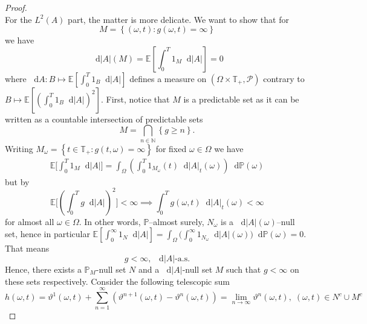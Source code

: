 \documentclass[11pt,a4paper,twoside,openany]{report}
\newcommand{\diff}{\mathop{}\!\mathrm{d}}
\theoremstyle{plain} %
\theoremstyle{definition} %
\theoremstyle{remark} %
\begin{document}
\begin{proof}
\begin{equation}
    \end{equation}
    For the \(L^2(A)\) part, the matter is more delicate. 
    We want to show that for
    \begin{equation}
        M=\left\{(\omega,t):g(\omega,t)=\infty\right\}
    \end{equation}
     we have 
     \begin{equation}
         \diff |A|(M) = \mathbb{E}[\int_0^T1_M\diff |A|]=0
     \end{equation}
     where \(\diff A:B\mapsto \mathbb{E}[\int_0^T1_B\diff |A|]\) defines a measure on \((\Omega\times\mathbb{T}_+,\mathcal{P})\) contrary to \(B\mapsto \mathbb{E}[\left(\int_0^T1_B\diff |A|\right)^2]\). First, notice that \(M\) is a predictable set as it can be written as a countable intersection of predictable sets
     \begin{equation}
         M=\bigcap_{n\in\mathbb{N}}\left\{g\geq n\right\}.
     \end{equation}
Writing \(M_{\omega}=\left\{t\in\mathbb{T}_+:g(t,\omega)=\infty\right\}\) for fixed \(\omega\in\Omega\) we have 
     \begin{align}
         \mathbb{E}\bigg[\int_0^T1_M\diff |A|\bigg]=\int_{\Omega}\left(\int_0^T1_{M_{\omega}}(t)\diff |A|_t(\omega)\right)\diff \mathbb{P}(\omega)
     \end{align}
     but by
     \begin{equation}
          \mathbb{E}\bigg[\left(\int_{0}^Tg\diff |A|\right)^2\bigg]<\infty\implies \int_{0}^Tg(\omega,t)\diff |A|_t(\omega)<\infty
     \end{equation}
     for almost all \(\omega\in \Omega\).
  In other words, \(\mathbb{P}\)--almost surely, \(N_{\omega}\) is a \(\diff|A|(\omega)\)--null set, hence in particular \(\mathbb{E}[\int_0^\infty 1_N\diff|A|]=\int_{\Omega}\big(\int_0^\infty 1_{N_{\omega}}\diff |A|(\omega)\big)\diff\mathbb{P}(\omega)=0\). That means
     \begin{equation}
         g<\infty,\; \diff |A|\text{-a.s.}
     \end{equation}
 Hence, there exists a \(\mathbb{P}_M\)-null set \(N\) and a \(\diff |A|\)-null set \(M\) such that \(g<\infty\) on these sets respectively. 
 Consider the following telescopic sum
 \begin{equation}
     h(\omega,t) = \vartheta^1(\omega,t)+\sum_{n=1}^{\infty}\left(\vartheta^{n+1}(\omega,t)-\vartheta^n(\omega,t)\right)=\lim_{n\to\infty}\vartheta^n(\omega,t),\;(\omega,t)\in N^c\cup M^c
 \end{equation}

\end{proof}
\end{document}
